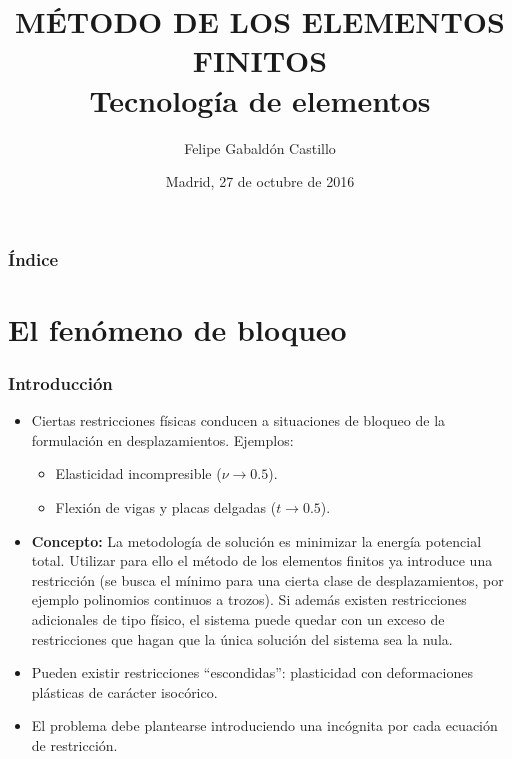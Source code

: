 \documentclass[handout]{beamer}
\title[Tecnología de elementos]{MÉTODO DE LOS ELEMENTOS FINITOS \\
Tecnología de elementos}
\author[F. Gabaldón]{Felipe Gabaldón Castillo}
\date{Madrid, 27 de octubre de 2016}
\begin{document}
\begin{frame}
\titlepage
\end{frame}
\begin{frame}
\frametitle{Índice}
\tableofcontents
\end{frame}
\section{El fenómeno de bloqueo}
\begin{frame}
\frametitle{Introducción}
\begin{itemize}
\item Ciertas restricciones físicas conducen a situaciones de bloqueo de
la formulación en desplazamientos. Ejemplos:
\begin{itemize}
\item Elasticidad incompresible ($\nu \rightarrow 0.5$).
\item Flexión de vigas y placas delgadas ($t \rightarrow 0.5$).
\end{itemize}
\item {\bf Concepto:} La
metodología de solución es minimizar la energía
potencial total. Utilizar para ello el método de los elementos finitos
ya introduce una restricción (se busca el mínimo para una cierta clase de
desplazamientos, por ejemplo polinomios continuos a trozos). Si además existen
restricciones adicionales de tipo físico, el sistema puede quedar con un
exceso de restricciones que hagan que la única solución del sistema sea
la nula.
\item Pueden existir restricciones ``escondidas'':
plasticidad con deformaciones plásticas de carácter isocórico.
\item El problema debe plantearse introduciendo una incógnita por cada ecuación
de restricción.
\end{itemize}
\end{frame}
\end{document}
